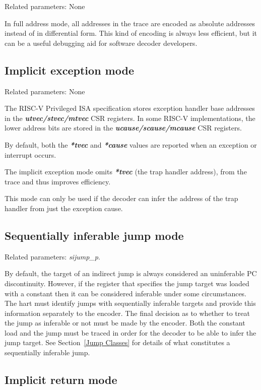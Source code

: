 Related parameters: None

In full address mode, all addresses in the trace are encoded as absolute addresses instead
of in differential form. This kind of encoding is always less efficient, but it can be a useful 
debugging aid for software decoder developers.

\subsection{Implicit exception mode} \label{sec:implicit-exception}

Related parameters: None

The RISC-V Privileged ISA specification stores exception handler base
addresses in the \textbf{\textit{utvec/stvec/mtvec}} CSR registers.
In some RISC-V implementations, the lower address bits are stored in
the \textbf{\textit{ucause/scause/mcause}} CSR registers.

By default, both the \textbf{\textit{*tvec}} and \textbf{\textit{*cause}} 
values are reported when an exception or interrupt occurs.

The implicit exception mode omits \textbf{\textit{*tvec}} (the trap handler address), 
from the trace and thus improves efficiency.

This mode can only be used if the decoder can infer the address of the trap handler
from just the exception cause.

\subsection{Sequentially inferable jump mode} \label{sec:si-jump}

Related parameters: \textit{sijump\_p}.

By default, the target of an indirect jump is always considered an uninferable PC discontinuity.  
However, if the register that specifies the jump target was loaded with a constant then it
can be considered inferable under some circumstances.  The hart must identify jumps with 
sequentially inferable targets and provide this information separately to the encoder.  The
final decision as to whether to treat the jump as inferable or not must be made by the encoder.
Both the constant load and the jump must be traced in order for the decoder to be able to
infer the jump target.  See Section~\ref{Jump Classes} for details of what constitutes a sequentially
inferable jump.

\subsection{Implicit return mode} \label{sec:implicit-return}

